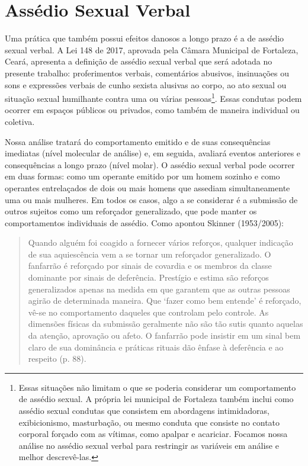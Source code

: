 \section*{Assédio Sexual Verbal}

Uma prática que também possui efeitos danosos a longo prazo é a de assédio sexual verbal. A Lei 148 de 2017, aprovada pela Câmara Municipal de Fortaleza, Ceará, apresenta a definição de assédio sexual verbal que será adotada no presente trabalho: proferimentos verbais, comentários abusivos, insinuações ou sons e expressões verbais de cunho sexista alusivas ao corpo, ao ato sexual ou situação sexual humilhante contra uma ou várias pessoas\footnote{Essas situações não limitam o que se poderia considerar um comportamento de assédio sexual. A própria lei municipal de Fortaleza também inclui como assédio sexual condutas que consistem em abordagens intimidadoras, exibicionismo, masturbação, ou mesmo conduta que consiste no contato corporal forçado com as vítimas, como apalpar e acariciar. Focamos nossa análise no assédio sexual verbal para restringir as variáveis em análise e melhor descrevê-las.}. Essas condutas podem ocorrer em espaços públicos ou privados, como também de maneira individual ou coletiva.

Nossa análise tratará do comportamento emitido e de suas consequências imediatas (nível molecular de análise) e, em seguida, avaliará eventos anteriores e consequências a longo prazo (nível molar). O assédio sexual verbal pode ocorrer em duas formas: como um operante emitido por um homem sozinho e como operantes entrelaçados de dois ou mais homens que assediam simultaneamente uma ou mais mulheres. Em todos os casos, algo a se considerar é a submissão de outros sujeitos como um reforçador generalizado, que pode manter os comportamentos individuais de assédio. Como apontou Skinner (1953/2005):

\begin{quote}
    Quando alguém foi coagido a fornecer vários reforços, qualquer indicação de sua aquiescência vem a se tornar um reforçador generalizado. O fanfarrão é reforçado por sinais de covardia e os membros da classe dominante por sinais de deferência. Prestígio e estima são reforços generalizados apenas na medida em que garantem que as outras pessoas agirão de determinada maneira. Que ‘fazer como bem entende’ é reforçado, vê-se no comportamento daqueles que controlam pelo controle. As dimensões físicas da submissão geralmente não são tão sutis quanto aquelas da atenção, aprovação ou afeto. O fanfarrão pode insistir em um sinal bem claro de sua dominância e práticas rituais dão ênfase à deferência e ao respeito (p. 88).
\end{quote}

